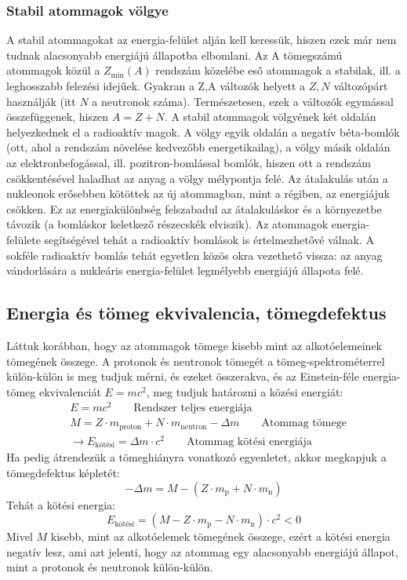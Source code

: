 \documentclass[../main.tex]{subfiles}
\begin{document}
\subsubsection*{Stabil atommagok völgye}
A stabil atommagokat az energia-felület alján kell keressük, hiszen ezek már nem tudnak alacsonyabb energiájú állapotba elbomlani. Az A tömegszámú atommagok közül a
$Z_{\min} (A)$ rendszám közelébe eső atommagok a stabilak, ill. a leghosszabb felezési idejűek.
Gyakran a Z,A változók helyett a $Z,N$ változópárt használják (itt $N$ a neutronok száma). Természetesen, ezek a változók egymással összefüggenek, hiszen $A = Z + N$.
A stabil atommagok völgyének két oldalán helyezkednek el a radioaktív magok. A
völgy egyik oldalán a negatív béta-bomlók (ott, ahol a rendszám növelése kedvezőbb energetikailag), a völgy másik oldalán az elektronbefogással, ill. pozitron-bomlással bomlók,
hiszen ott a rendszám csökkentésével haladhat az anyag a völgy mélypontja felé. Az
átalakulás után a nukleonok erősebben kötöttek az új atommagban, mint a régiben, az
energiájuk csökken. Ez az energiakülönbség felszabadul az átalakuláskor és a környezetbe távozik (a bomláskor keletkező részecskék elviszik). Az atommagok energia-felülete
segítségével tehát a radioaktív bomlások is értelmezhetővé válnak. A sokféle radioaktív
bomlás tehát egyetlen közös okra vezethető vissza: az anyag vándorlására a nukleáris
energia-felület legmélyebb energiájú állapota felé.

\subsection{Energia és tömeg ekvivalencia, tömegdefektus}
Láttuk korábban, hogy az atommagok tömege kisebb mint az alkotóelemeinek tömegének összege. A protonok és neutronok tömegét a tömeg-spektrométerrel külön-külön is meg tudjuk mérni,
és ezeket összerakva, és az Einstein-féle energia-tömeg ekvivalenciát $E = mc^2$, meg tudjuk határozni a közési energiát:
\begin{equation}
    \begin{aligned}
        &E = m c^2 \qquad \text{Rendszer teljes energiája} \\
        &M = Z \cdot m_{\text{proton}} + N \cdot m_{\text{neutron}} - \Delta m \qquad \text{Atommag tömege} \\
        &\rightarrow E_{\text{kötési}} = \Delta m \cdot c^2 \qquad \text{Atommag kötési energiája}
    \end{aligned}
\end{equation}
Ha pedig átrendezük a tömeghiányra vonatkozó egyenletet, akkor megkapjuk a tömegdefektus képletét:
\begin{equation}
    - \Delta m = M - \left( Z \cdot m_{\text{p}} + N \cdot m_{\text{n}} \right)
\end{equation}
Tehát a kötési energia:
\begin{equation}
    E_{\text{kötési}} = \left( M -  Z \cdot m_{\text{p}} - N \cdot m_{\text{n}} \right) \cdot c^2 < 0
\end{equation}
Mivel $M$ kisebb, mint az alkotóelemek tömegének összege, ezért a kötési energia negatív lesz, ami azt jelenti, hogy az atommag egy alacsonyabb energiájú állapot, mint a protonok és neutronok külön-külön.
\end{document}
